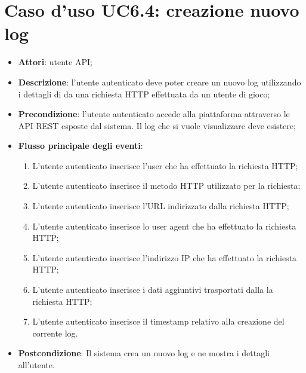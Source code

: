 \section{Caso d'uso UC6.4: creazione nuovo log}
\begin{itemize}
\item \textbf{Attori}: utente API;
\item \textbf{Descrizione}: l'utente autenticato deve poter creare un nuovo log utilizzando i dettagli di da una richiesta HTTP effettuata da un utente di gioco; 
      \item \textbf{Precondizione}: l'utente autenticato accede alla piattaforma attraverso le API REST esposte dal sistema. Il log che si vuole visualizzare deve esistere;

        \item \textbf{Flusso principale degli eventi}:
          \begin{enumerate}
          \item L'utente autenticato inserisce l'user che ha effettuato la richiesta HTTP;
          \item L'utente autenticato inserisce il metodo HTTP utilizzato per la richiesta;
          \item L'utente autenticato inserisce l'URL indirizzato dalla richiesta HTTP;
          \item L'utente autenticato inserisce lo user agent che ha effettuato la richiesta HTTP;
          \item L'utente autenticato inserisce l'indirizzo IP che ha effettuato la richiesta HTTP;
          \item L'utente autenticato inserisce i dati aggiuntivi trasportati dalla la richiesta HTTP;
          \item L'utente autenticato inserisce il timestamp relativo alla creazione del corrente log.

      \end{enumerate}
    \item \textbf{Postcondizione}: Il sistema crea un nuovo log e ne mostra i dettagli all'utente.
  \end{itemize}
\hypertarget{UC6.5}{}
